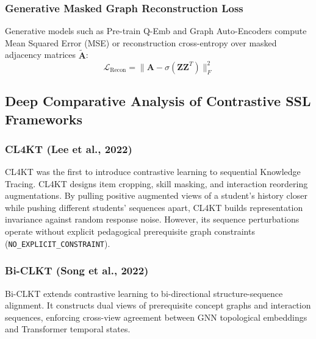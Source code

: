 \documentclass[10pt,journal,compsoc]{IEEEtran}
\begin{document}
\subsubsection{Generative Masked Graph Reconstruction Loss}
Generative models such as Pre-train Q-Emb \cite{KT026_PretrainQ_2020} and Graph Auto-Encoders compute Mean Squared Error (MSE) or reconstruction cross-entropy over masked adjacency matrices $\tilde{\mathbf{A}}$:
\begin{equation}
\mathcal{L}_{\text{Recon}} = \|\mathbf{A} - \sigma(\mathbf{Z} \mathbf{Z}^T)\|_F^2
\end{equation}

\subsection{Deep Comparative Analysis of Contrastive SSL Frameworks}

\subsubsection{CL4KT (Lee et al., 2022)}
CL4KT \cite{KT039_CL4KT_2022} was the first to introduce contrastive learning to sequential Knowledge Tracing. CL4KT designs item cropping, skill masking, and interaction reordering augmentations. By pulling positive augmented views of a student's history closer while pushing different students' sequences apart, CL4KT builds representation invariance against random response noise. However, its sequence perturbations operate without explicit pedagogical prerequisite graph constraints (\texttt{NO\_EXPLICIT\_CONSTRAINT}).

\subsubsection{Bi-CLKT (Song et al., 2022)}
Bi-CLKT \cite{KT011_BiCLKT_2022} extends contrastive learning to bi-directional structure-sequence alignment. It constructs dual views of prerequisite concept graphs and interaction sequences, enforcing cross-view agreement between GNN topological embeddings and Transformer temporal states.
\end{document}
